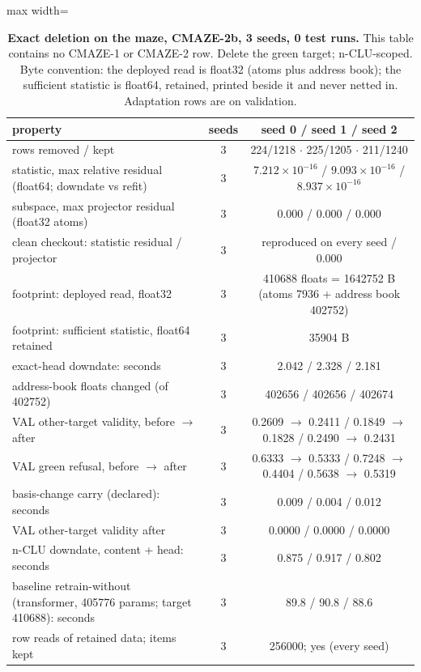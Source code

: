 \documentclass{article} %
\newcommand{\sci}[2]{\ensuremath{#1\times10^{#2}}}
\begin{document}
\begin{table}[h]
\centering\small
\caption{\textbf{Exact deletion on the maze, CMAZE-2b, 3 seeds, 0 test runs.} This table %
contains no CMAZE-1 or CMAZE-2 row. Delete the green target; n-CLU-scoped. Byte convention: the
deployed read is float32 (atoms plus address book); the sufficient statistic is float64, retained,
printed beside it and never netted in. Adaptation rows are on validation.}
\label{tab:maze-del-2b}
\begin{adjustbox}{max width=\linewidth}\begin{tabular}{lcc}
\toprule
property & seeds & seed 0 / seed 1 / seed 2 \\
\midrule
rows removed / kept & 3 & 224/1218 $\cdot$ 225/1205 $\cdot$ 211/1240 \\
statistic, max relative residual (float64; downdate vs refit) & 3 & \sci{7.212}{-16} / \sci{9.093}{-16} / \sci{8.937}{-16} \\
subspace, max projector residual (float32 atoms) & 3 & 0.000 / 0.000 / 0.000 \\
clean checkout: statistic residual / projector & 3 & reproduced on every seed / 0.000 \\
footprint: deployed read, float32 & 3 & 410688 floats = 1642752 B (atoms 7936 + address book 402752) \\
footprint: sufficient statistic, float64 retained & 3 & 35904 B \\
exact-head downdate: seconds & 3 & 2.042 / 2.328 / 2.181 \\
\quad address-book floats changed (of 402752) & 3 & 402656 / 402656 / 402674 \\
\quad VAL other-target validity, before $\to$ after & 3 & 0.2609 $\to$ 0.2411 / 0.1849 $\to$ 0.1828 / 0.2490 $\to$ 0.2431 \\
\quad VAL green refusal, before $\to$ after & 3 & 0.6333 $\to$ 0.5333 / 0.7248 $\to$ 0.4404 / 0.5638 $\to$ 0.5319 \\
basis-change carry (declared): seconds & 3 & 0.009 / 0.004 / 0.012 \\
\quad VAL other-target validity after & 3 & 0.0000 / 0.0000 / 0.0000 \\
n-CLU downdate, content + head: seconds & 3 & 0.875 / 0.917 / 0.802 \\
baseline retrain-without (transformer, 405776 params; target 410688): seconds & 3 & 89.8 / 90.8 / 88.6 \\
\quad row reads of retained data; items kept & 3 & 256000; yes (every seed) \\
\bottomrule
\end{tabular}\end{adjustbox}
\end{table}
\end{document}

